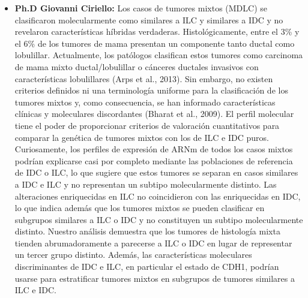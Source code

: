 \begin{itemize}[label=\PencilRightDown]
	
	\item \textbf{Ph.D Giovanni Ciriello:} Los casos de tumores mixtos (MDLC) se clasificaron molecularmente como similares a ILC y similares a IDC y no revelaron características híbridas verdaderas. Histológicamente, entre el 3\% y el 6\% de los tumores de mama presentan un componente tanto ductal como lobulillar. Actualmente, los patólogos clasifican estos tumores como carcinoma de mama mixto ductal/lobulillar o cánceres ductales invasivos con características lobulillares (Arps et al., 2013). Sin embargo, no existen criterios definidos ni una terminología uniforme para la clasificación de los tumores mixtos y, como consecuencia, se han informado características clínicas y moleculares discordantes (Bharat et al., 2009). El perfil molecular tiene el poder de proporcionar criterios de valoración cuantitativos para comparar la genética de tumores mixtos con los de ILC e IDC puros. Curiosamente, los perfiles de expresión de ARNm de todos los casos mixtos podrían explicarse casi por completo mediante las poblaciones de referencia de IDC o ILC, lo que sugiere que estos tumores se separan en casos similares a IDC e ILC y no representan un subtipo molecularmente distinto. Las alteraciones enriquecidas en ILC no coincidieron con las enriquecidas en IDC, lo que indica además que los tumores mixtos se pueden clasificar en subgrupos similares a ILC o IDC y no constituyen un subtipo molecularmente distinto. Nuestro análisis demuestra que los tumores de histología mixta tienden abrumadoramente a parecerse a ILC o IDC en lugar de representar un tercer grupo distinto. Además, las características moleculares discriminantes de IDC e ILC, en particular el estado de CDH1, podrían usarse para estratificar tumores mixtos en subgrupos de tumores similares a ILC e IDC\cite{Ciriello2015}.
	
\end{itemize}

